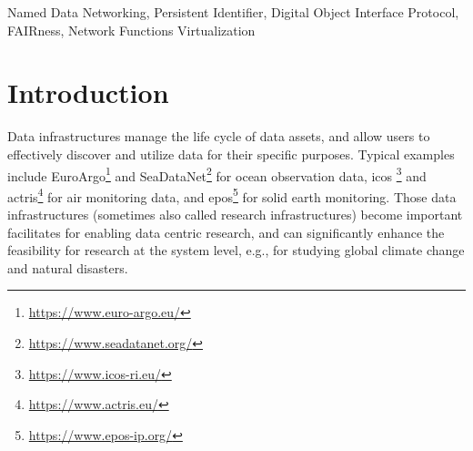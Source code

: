 \documentclass[conference]{IEEEtran}
\begin{document}
\begin{abstract}

\end{abstract}

\begin{IEEEkeywords}
Named Data Networking, Persistent Identifier, Digital Object Interface Protocol, FAIRness, Network Functions Virtualization
\end{IEEEkeywords}

\section{Introduction}
Data infrastructures manage the life cycle of data assets, and allow users to effectively discover and utilize data for their specific purposes. Typical examples include EuroArgo\footnote{\url{https://www.euro-argo.eu/}} and SeaDataNet\footnote{\url{https://www.seadatanet.org/}} for ocean observation data, \gls{icos} \footnote{\url{https://www.icos-ri.eu/}} and \gls{actris}\footnote{\url{https://www.actris.eu/}} for air monitoring data, and \gls{epos}\footnote{\url{https://www.epos-ip.org/}} for solid earth monitoring. Those data infrastructures (sometimes also called research infrastructures) become important facilitates for enabling data centric research, and can significantly enhance the feasibility for research at the system level, e.g., for studying global climate change and natural disasters. 
\end{document}
